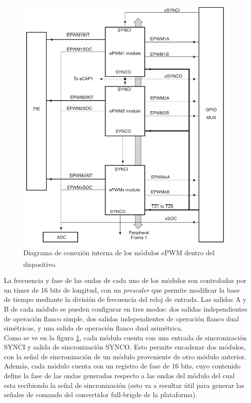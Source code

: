 \begin{figure}[h]
    \centering
    \includegraphics[scale=0.35]{Imagenes/Modulo ePWM.png}
    \caption{Diagrama de conexión interna de los módulos ePWM dentro del dispositivo.\textsuperscript{\cite{DSP-TechManual}}}
    \label{Modulo-ePWM}
\end{figure}

La frecuencia y fase de las ondas de cada uno de los módulos son controladas por un timer de 16 bits de longitud, con un \textit{prescaler} que permite modificar la base de tiempo mediante la división de frecuencia del reloj de entrada. Las salidas A y B de cada módulo se pueden configurar en tres modos: dos salidas independientes de operación flanco simple, dos salidas independientes de operación flanco dual simétricas, y una salida de operación flanco dual asimétrica.\\

Como se ve en la figura \ref{Modulo-ePWM}, cada módulo cuenta con una entrada de sincronización SYNCI y salida de sincronización SYNCO. Esto permite encadenar dos módulos, con la señal de sincronización de un módulo proveniente de otro módulo anterior. Además, cada módulo cuenta con un registro de fase de 16 bits, cuyo contenido define la fase de las ondas generadas respecto a las ondas del módulo del cual esta recibiendo la señal de sincronización (esto va a resultar útil para generar las señales de comando del convertidor full-brigde de la plataforma).\\

